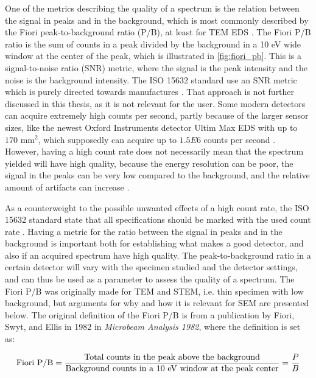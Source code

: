 One of the metrics describing the quality of a spectrum is the relation between the signal in peaks and in the background, which is most commonly described by the Fiori peak-to-background ratio (P/B), at least for TEM EDS \cite{williams_carter_tem_2009}.
The Fiori P/B ratio is the sum of counts in a peak divided by the background in a 10 eV wide window at the center of the peak, which is illustrated in \cref{fig:fiori_pb}.
This is a signal-to-noise ratio (SNR) metric, where the signal is the peak intensity and the noise is the background intensity.
The ISO 15632 standard use an SNR metric which is purely directed towards manufactures \cite{iso_qc_15632}.
That approach is not further discussed in this thesis, as it is not relevant for the user.
Some modern detectors can acquire extremely high counts per second, partly because of the larger sensor sizes, like the newest Oxford Instruments detector Ultim Max EDS with up to $170$ mm$^2$, which supposedly can acquire up to $1.5E6$ counts per second \cite{oxford_ultim_max}.
However, having a high count rate does not necessarily mean that the spectrum yielded will have high quality, because the energy resolution can be poor, the signal in the peaks can be very low compared to the background, and the relative amount of artifacts can increase \cite{iso_qc_15632}.


As a counterweight to the possible unwanted effects of a high count rate, the ISO 15632 standard state that all specifications should be marked with the used count rate \cite{iso_qc_15632}.
Having a metric for the ratio between the signal in peaks and in the background is important both for establishing what makes a good detector, and also if an acquired spectrum have high quality.
The peak-to-background ratio in a certain detector will vary with the specimen studied and the detector settings, and can thus be used as a parameter to assess the quality of a spectrum.
The Fiori P/B was originally made for TEM and STEM, i.e. thin specimen with low background, but arguments for why and how it is relevant for SEM are presented below.
The original definition of the Fiori P/B is from a publication by Fiori, Swyt, and Ellis in 1982 \cite{fiori_peak_background_1982} in \emph{Microbeam Analysis 1982}, where the definition is set as:

\begin{equation}
    \label{eq:fiori_pb}
    \textnormal{Fiori P/B} = \frac{\textnormal{Total counts in the peak above the background}}{\textnormal{Background counts in a 10 eV window at the peak center}} = \frac{P}{B}
\end{equation}


